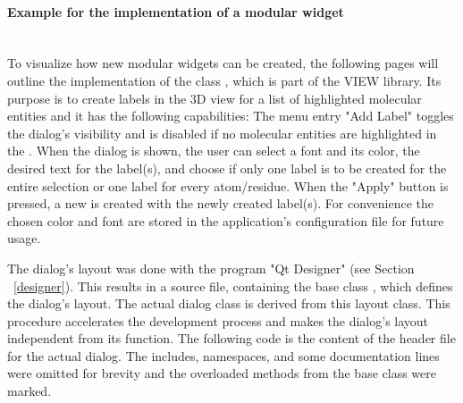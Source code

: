 \paragraph{Example for the implementation of a modular widget}
\hspace*{\fill}\\
To visualize how new modular widgets can be created, the following pages will 
outline the implementation of the class , which is part of 
the VIEW library. Its purpose is to create labels in the 3D view for a list of 
highlighted molecular entities and it has the following capabilities:
The menu entry {"Add Label"} toggles the dialog's visibility and is disabled 
if no molecular entities are highlighted in the .
When the dialog is shown, the user can select a font and its color, the 
desired text for the label(s), and choose if only one label is to be created 
for the entire selection or one label for every atom/residue. When the 
"Apply" button is pressed, a new  is created with the 
newly created label(s). For convenience the chosen color and font are stored 
in the application's configuration file for future usage.

The dialog's layout was done with the program "Qt Designer" (see 
Section ~\ref{designer}). This results in a source file, containing the base 
class , which defines the dialog's layout. The 
actual dialog class is derived from this layout class. This procedure 
accelerates the development process and makes the dialog's layout independent 
from its function. The following code is the content of the header file for 
the actual dialog. The includes, namespaces, and some documentation lines 
were omitted for brevity and the overloaded methods from the 
 base class were marked.

